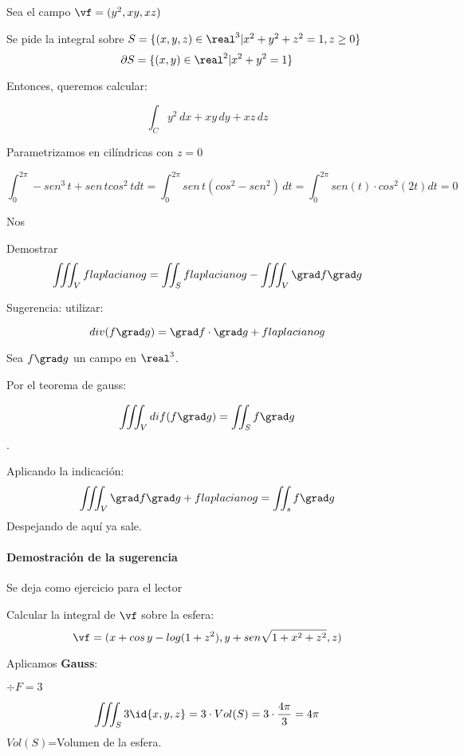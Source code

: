 \begin{problem}[20]
Sea el campo $\vf = (y^2,xy,xz)$

Se pide la integral sobre $S= \{(x,y,z)\in \real^3 | x^2+y^2+z^2=1, z\ge 0\}$
\solution
\[\partial S = \{(x,y)\in\real^2|x^2+y^2=1\}\]

Entonces, queremos calcular:

\[\int_C y^2\,dx + xy\,dy + xz\,dz\]

Parametrizamos en cilíndricas con $z=0$

\[\int_0^{2\pi} -sen^3\,t + sen\,tcos^2\,t dt = \int_0^{2\pi} sen\,t(cos^2-sen^2)\,dt = \int_0^{2\pi} sen(t)\cdot cos^2(2t)dt = 0\]

Nos

\end{problem}

\begin{problem}[29]
Demostrar
\[\iiint_V f laplaciano g = \iint_S f laplaciano g - \iiint_V \grad f \grad g\]

Sugerencia: utilizar:

\[div(f\grad g) =\grad f \cdot \grad g + f laplaciano g\]
\solution

Sea $f\grad g$ un campo en $\real^3$.

Por el teorema de gauss:

\[\iiint_V dif(f\grad g) = \iint_S f\grad g\].


Aplicando la indicación:
\[\iiint_V \grad f \grad g + f laplaciano g = \iint_s f \grad g\]
Despejando de aquí ya sale.

\paragraph{Demostración de la sugerencia}

Se deja como ejercicio para el lector
\end{problem}

\begin{problem}[24]
Calcular la integral de $\vf$ sobre la esfera:
\[\vf= (x+cos\,y - log(1+z^2),y+sen\sqrt{1+x^2+z^2},z)\]

\solution
Aplicamos \textbf{Gauss}:

$\div F = 3$

\[\iiint_S 3\id{x,y,z} = 3\cdot Vol(S) = 3\cdot \frac{4\pi}{3} = 4\pi\]
$Vol(S)$=Volumen de la esfera.
\end{problem}

